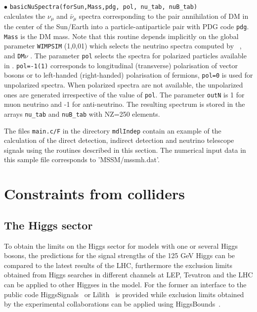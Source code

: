 \documentclass[12pt,a4paper]{article}
\begin{document}
{\noindent

$\bullet$ \verb|basicNuSpectra(forSun,Mass,pdg, pol, nu_tab, nuB_tab) |\\
calculates  the $\nu_{\mu}$   and  $\bar{\nu}_{\mu}$ spectra
corresponding to the pair annihilation of DM in the center of the Sun/Earth
into a particle-antiparticle pair with PDG code {\tt pdg}. \verb|Mass| is the DM mass.
Note that this
routine depends implicitly on the global parameter {\tt WIMPSIM} (1,0,01) which selects the neutrino spectra computed by
 \wimpsim~\cite{Blennow:2007tw}, \pppc~\cite{Baratella:2013fya} and  {\tt DM$\nu$}
\cite{Cirelli:2005gh}.
The parameter {\tt pol} selects the spectra for  polarized particles available  in
\pppc. {\tt pol=-1(1)} corresponds to longitudinal (transverse) polarisation
of vector bosons or to left-handed (right-handed)  polarisation of  fermions, {\tt pol=0}
is used for unpolarized spectra. When polarized spectra are not available, the unpolarized ones are generated irrespective of the value of \verb|pol|. 
The parameter {\tt outN} is 1 for muon neutrino and -1 for anti-neutrino. The resulting spectrum is stored in the
arrays   \verb|nu_tab| and \verb|nuB_tab| with NZ=250 elements.

The files {\verb|main.c/F|} in the directory {\tt mdlIndep}  contain an example of the calculation of the direct detection,  indirect detection 
and neutrino telescope signals using the routines described in this section. 
The numerical input data in this sample file corresponds to 'MSSM/mssmh.dat'. 

\section{Constraints from colliders}

\subsection{The Higgs sector}
To obtain the  limits on the Higgs sector for models with one or several Higgs bosons, the predictions for the signal strengths of the 125 GeV Higgs  can be
compared  to the latest results of the LHC, furthermore the exclusion limits obtained from Higgs searches in different channels at LEP, Tevatron and the LHC can be applied to other Higgses in the model. For the former  an interface to the public code HiggsSignals~\cite{Bechtle:2013xfa} or Lilith~\cite{Bernon:2015hsa} is provided while  exclusion limits obtained by the experimental collaborations can be applied using 
HiggsBounds~\cite{Bechtle:2013wla}. 

}
\end{document}

